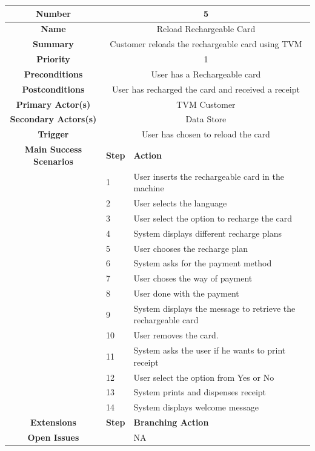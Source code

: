 \documentclass[a4paper,12pt]{report}
\begin{document}
\begin{tabular}{ | c | p{2cm} | p{7cm} |}
	\hline
	\textbf{Number} & \multicolumn{2}{c|}{5}  \\
	\hline
	\textbf{Name} & \multicolumn{2}{c|}{Reload Rechargeable Card}  \\
	\hline
	\textbf{Summary} & \multicolumn{2}{c|}{Customer reloads the rechargeable card using TVM}  \\
	\hline
	\textbf{Priority} & \multicolumn{2}{c|}{1}  \\
	\hline
	\textbf{Preconditions} & \multicolumn{2}{c|}{User has a Rechargeable card}  \\
	\hline
	\textbf{Postconditions} & \multicolumn{2}{c|}{User has recharged the card and received a receipt}  \\
	\hline
	\textbf{Primary Actor(s)} & \multicolumn{2}{c|}{TVM Customer}  \\
	\hline
	\textbf{Secondary Actors(s)} & \multicolumn{2}{c|}{Data Store}  \\
	\hline
	\textbf{Trigger} & \multicolumn{2}{c|}{User has chosen to reload the card}  \\
	\hline
	\textbf{Main Success Scenarios} & \textbf{Step} & \textbf{Action} \\
	\hline
	& 1 & User inserts the rechargeable card in the machine \\ 
	\hline
	&  2  & User selects the language \\
	\hline
	&  3  & User select the option to recharge the card \\
	\hline
	&  4  & System displays different recharge plans \\
	\hline
	&  5  & User chooses the recharge plan \\
	\hline
	&  6  & System asks for the payment method \\
	\hline
	&  7  & User choses the way of payment \\
	\hline
	&  8  & User done with the payment \\
	\hline
	&  9  & System displays the message to retrieve the rechargeable card \\
	\hline
	&  10  & User removes the card. \\
	\hline
	&  11  & System asks the user if he wants to print receipt \\
	\hline
	&  12  & User select the option from Yes or No \\
	\hline
	&  13  & System prints and dispenses receipt \\
	\hline
	&  14  & System displays welcome message \\
	\hline
	
	\textbf{Extensions} & \textbf{Step} & \textbf{Branching Action} \\
	\hline
	\textbf{Open Issues} &    & NA \\
	\hline
	
\end{tabular}
\end{document}
